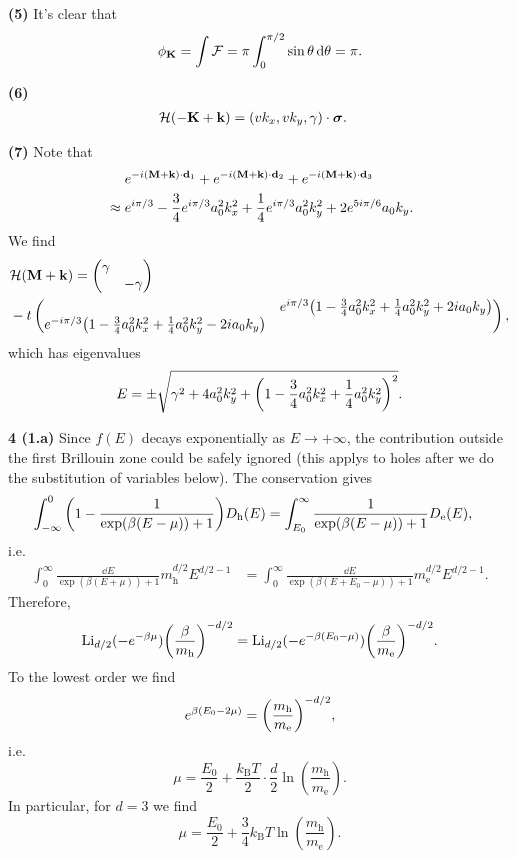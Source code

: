 \documentclass{article}
\makeatletter
\newcommand*{\shifttext}[1]{%
  \settowidth{\@tempdima}{#1}%
  \hspace{-\@tempdima}#1%
}
\newcommand{\plabel}[1]{%
\shifttext{\textbf{#1}\quad}%
}
\newcommand{\prule}{%
\begin{center}%
\hdashrule[0.5ex]{.99\linewidth}{1pt}{1pt 2.5pt}%
\end{center}%
}
\newcommand{\minusbaseline}{\abovedisplayskip=0pt\abovedisplayshortskip=0pt~\vspace*{-\baselineskip}}%
\makeatother
\begin{document}
\plabel{(5)}%
It's clear that
\[ \phi_{\vb{K}} = \int \mathcal{F} = \pi \int_{0}^{\pi/2} \sin\theta \dd{\theta} = \pi. \]

\plabel{(6)}%
\begingroup\minusbaseline%
\begin{align*}
  \mathcal{H}(-\vb{K} + \vb{k}) &= \qty(v k_x, v k_y, \gamma) \cdot \vb*{\sigma}.
\end{align*}
\endgroup

\plabel{(7)}%
Note that
\begin{align*}
  &\phantom{{}\approx{}} e^{-i(\vb{M} + \vb{k})\cdot \vb{d}_1} + e^{-i(\vb{M} + \vb{k})\cdot \vb{d}_2} + e^{-i(\vb{M} + \vb{k})\cdot \vb{d}_3} \\ &\approx e^{i\pi / 3} - \frac{3}{4} e^{i\pi/3} a_0^2 k_x^2 + \frac{1}{4} e^{i\pi/3} a_0^2 k_y^2 + 2 e^{5i\pi/6} a_0 k_y.
\end{align*}
We find
\begin{align*}
  & \mathcal{H}(\vb{M} + \vb{k}) = \begin{pmatrix}
    \gamma & \\ & -\gamma
  \end{pmatrix} \\
  &{} - t \begin{pmatrix}
    & e^{i\pi / 3}\qty(1 - \frac{3}{4} a_0^2 k_x^2 + \frac{1}{4} a_0^2 k_y^2 + 2 i a_0 k_y) \\
    e^{-i\pi / 3}\qty(1 - \frac{3}{4} a_0^2 k_x^2 + \frac{1}{4} a_0^2 k_y^2 - 2 i a_0 k_y)  &
  \end{pmatrix},
\end{align*}
which has eigenvalues
\[ E = \pm \sqrt{\gamma^2 + 4a_0^2 k_y^2 + \qty(1 - \frac{3}{4} a_0^2 k_x^2 + \frac{1}{4} a_0^2 k_y^2)^2}. \]

\prule

\plabel{4 (1.a)}%
Since $f(E)$ decays exponentially as $E\rightarrow +\infty$, the contribution outside the first Brillouin zone could be safely ignored (this applys to holes after we do the substitution of variables below).
The conservation gives
\begin{align*}
  \int_{-\infty}^0 \qty(1 - \frac{1}{\exp(\beta(E - \mu)) + 1}) D_{\mathrm{h}}(E) &= \int_{E_0}^\infty \frac{1}{\exp(\beta(E - \mu)) + 1} D_{\mathrm{e}}(E),
\end{align*}
i.e.
\begin{align*}
  \int_{0}^\infty \frac{\dd{E} }{\exp(\beta(E + \mu)) + 1} m^{d/2}_{\mathrm{h}} E^{d/2-1} &=
  \int_{0}^\infty \frac{\dd{E}}{\exp(\beta(E + E_0 - \mu)) + 1} m^{d/2}_{\mathrm{e}} E^{d/2-1}.
\end{align*}
Therefore,
\[ \operatorname{Li}_{d/2}(-e^{-\beta\mu}) \qty(\frac{\beta}{m_{\mathrm{h}}})^{-d/2} = \operatorname{Li}_{d/2}(-e^{-\beta(E_0 - \mu)}) \qty(\frac{\beta}{m_{\mathrm{e}}})^{-d/2}. \]
To the lowest order we find
\[ e^{\beta(E_0 - 2\mu)} = \qty(\frac{m_{\mathrm{h}}}{m_{\mathrm{e}}})^{-d/2}, \]
i.e.
\[ \mu = \frac{E_0}{2} + \frac{k_{\mathrm{B}}T}{2} \cdot \frac{d}{2} \ln(\frac{m_{\mathrm{h}}}{m_{\mathrm{e}}}). \]
In particular, for $d=3$ we find
\[ \mu = \frac{E_0}{2} + \frac{3}{4} k_{\mathrm{B}}T\ln(\frac{m_{\mathrm{h}}}{m_{\mathrm{e}}}). \]
\end{document}
